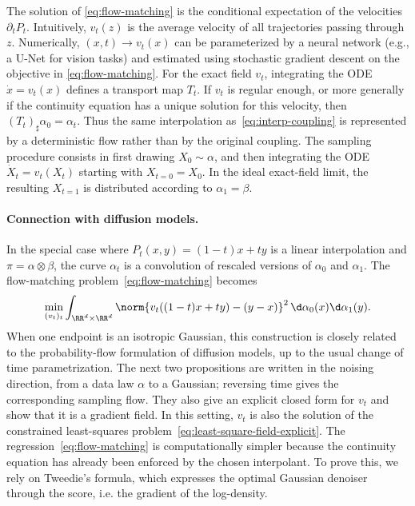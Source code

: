 The solution of \eqref{eq:flow-matching} is the conditional expectation of the velocities $\partial_t P_t$. Intuitively, $v_t(z)$ is the average velocity of all trajectories passing through $z$.
%
Numerically, $(x,t) \to v_t(x)$ can be parameterized by a neural network (e.g., a U-Net for vision tasks) and estimated using stochastic gradient descent on the objective in \eqref{eq:flow-matching}.
%
For the exact field $v_t$, integrating the ODE $\dot{x}=v_t(x)$ defines a transport map $T_t$. If $v_t$ is regular enough, or more generally if the continuity equation has a unique solution for this velocity, then $(T_t)_\sharp\alpha_0=\alpha_t$. Thus the same interpolation as~\eqref{eq:interp-coupling} is represented by a deterministic flow rather than by the original coupling.
The sampling procedure consists in first drawing $X_0 \sim \alpha$, and then integrating the ODE $\dot{X}_t = v_t(X_t)$ starting with $X_{t=0} = X_0$.
In the ideal exact-field limit, the resulting $X_{t=1}$ is distributed according to $\alpha_1 = \beta$.

\paragraph{Connection with diffusion models.}

In the special case where $P_t(x,y)=(1-t)x+ty$ is a linear interpolation and $\pi = \alpha \otimes \beta$, the curve $\alpha_t$ is a convolution of rescaled versions of $\alpha_0$ and $\alpha_1$. The flow-matching problem~\eqref{eq:flow-matching} becomes
\[
    \min_{(v_t)_t} \int_{\RR^{d} \times \RR^d} \norm{v_t( (1-t)x+t y ) - (y-x) }^2 \, \d\alpha_0(x) \d\alpha_1(y).
\]
When one endpoint is an isotropic Gaussian, this construction is closely related to the probability-flow formulation of diffusion models, up to the usual change of time parametrization. The next two propositions are written in the noising direction, from a data law $\alpha$ to a Gaussian; reversing time gives the corresponding sampling flow. They also give an explicit closed form for $v_t$ and show that it is a gradient field.
%
In this setting, $v_t$ is also the solution of the constrained least-squares problem~\eqref{eq:least-square-field-explicit}. The regression~\eqref{eq:flow-matching} is computationally simpler because the continuity equation has already been enforced by the chosen interpolant.
%
To prove this, we rely on Tweedie's formula, which expresses the optimal Gaussian denoiser through the score, i.e. the gradient of the log-density.


